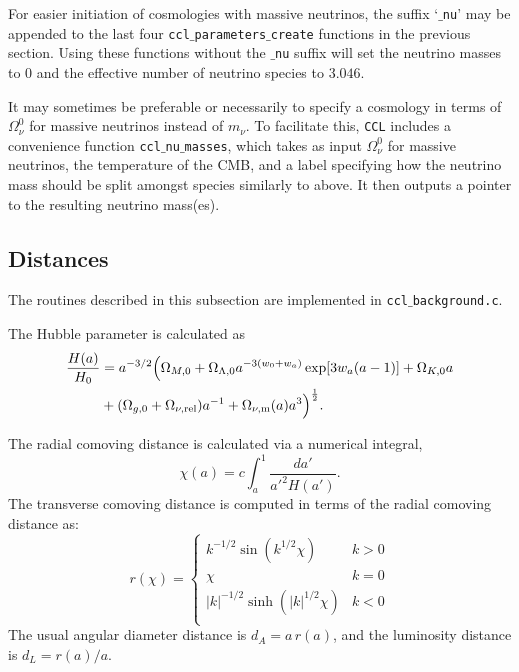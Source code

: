 \documentclass[\docopts]{\docclass}
\newcommand{\ccl}{{\tt CCL}\xspace}
\begin{document}
For easier initiation of cosmologies with massive neutrinos, the suffix `{\tt $\_$nu}' may be appended to the last four {\tt ccl$\_$parameters$\_$create} functions in the previous section. Using these functions without the {\tt $\_$nu} suffix will set the neutrino masses to 0 and the effective number of neutrino species to $3.046$. 

It may sometimes be preferable or necessarily to specify a cosmology in terms of $\Omega_\nu^0$ for massive neutrinos instead of $m_\nu$. To facilitate this, \ccl includes a convenience function {\tt ccl$\_$nu$\_$masses}, which takes as input $\Omega_\nu^0$ for massive neutrinos, the temperature of the CMB, and a label specifying how the neutrino mass should be split amongst species similarly to above. It then outputs a pointer to the resulting neutrino mass(es). 


\subsection{Distances}
\label{sec:distances}

The routines described in this subsection are implemented in {\tt ccl$\_$background.c}.

The Hubble parameter is calculated as
%
\begin{align}\label{eq:Ha}
\frac{H(a)}{H_0} &= a^{-3/2}\Big(\Omega_{M,0}+\Omega_{\Lambda,0} a^{-3(w_0+w_a)}
    \exp[3 w_a (a-1)]+\Omega_{K,0} a \nonumber \\ &+(\Omega_{g,0} + \Omega_{\nu, {\rm rel}}) a^{-1} + \Omega_{\nu, {\rm m}}(a)a^3\Big)^{\frac{1}{2}}.
\end{align}

The radial comoving distance is calculated via a numerical integral,
\begin{equation}
 \chi(a)= c \int_a^1 \frac{da'}{a'^2 H(a')}.
\end{equation}
The transverse comoving distance is computed in terms of the radial comoving distance as:
\begin{equation}\label{eq:angdist}
 r(\chi)=\left\{\begin{array}{cc}
                 k^{-1/2}\sin(k^{1/2}\chi) & k>0\\
                 \chi & k=0\\
                 |k|^{-1/2}\sinh(|k|^{1/2}\chi) & k<0\\
                \end{array}\right.
\end{equation}
The usual angular diameter distance is $d_A=a\,r(a)$, and the luminosity distance is
$d_L=r(a)/a$.
\end{document}
